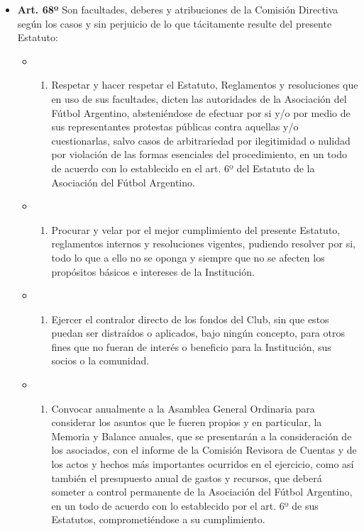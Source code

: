 \documentclass[openany]{book}
\providecommand{\tightlist}{%
  \setlength{\itemsep}{0pt}\setlength{\parskip}{0pt}}
\begin{document}
\begin{itemize}
\tightlist
\item
  \textbf{Art. 68º}
  Son facultades, deberes y atribuciones de la Comisión Directiva según los casos y sin perjuicio de lo que tácitamente resulte del presente Estatuto:

  \begin{itemize}
  \item
    \begin{enumerate}
    \def\labelenumi{\alph{enumi})}
    \tightlist
    \item
      Respetar y hacer respetar el Estatuto, Reglamentos y resoluciones que en uso de sus facultades, dicten las autoridades de la Asociación del Fútbol Argentino, absteniéndose de efectuar por si y/o por medio de sus representantes protestas públicas contra aquellas y/o cuestionarlas, salvo casos de arbitrariedad por ilegitimidad o nulidad por violación de las formas esenciales del procedimiento, en un todo de acuerdo con lo establecido en el art. 6º del Estatuto de la Asociación del Fútbol Argentino.
    \end{enumerate}
  \item
    \begin{enumerate}
    \def\labelenumi{\alph{enumi})}
    \setcounter{enumi}{1}
    \tightlist
    \item
      Procurar y velar por el mejor cumplimiento del presente Estatuto, reglamentos internos y resoluciones vigentes, pudiendo resolver por si, todo lo que a ello no se oponga y siempre que no se afecten los propósitos básicos e intereses de la Institución.
    \end{enumerate}
  \item
    \begin{enumerate}
    \def\labelenumi{\alph{enumi})}
    \setcounter{enumi}{2}
    \tightlist
    \item
      Ejercer el contralor directo de los fondos del Club, sin que estos puedan ser distraídos o aplicados, bajo ningún concepto, para otros fines que no fueran de interés o beneficio para la Institución, sus socios o la comunidad.
    \end{enumerate}
  \item
    \begin{enumerate}
    \def\labelenumi{\alph{enumi})}
    \setcounter{enumi}{3}
    \tightlist
    \item
      Convocar anualmente a la Asamblea General Ordinaria para considerar los asuntos que le fueren propios y en particular, la Memoria y Balance anuales, que se presentarán a la consideración de los asociados, con el informe de la Comisión Revisora de Cuentas y de los actos y hechos más importantes ocurridos en el ejercicio, como así también el presupuesto anual de gastos y recursos, que deberá someter a control permanente de la Asociación del Fútbol Argentino, en un todo de acuerdo con lo establecido por el art. 6º de sus Estatutos, comprometiéndose a su cumplimiento.

\end{enumerate}
\end{itemize}
\end{itemize}
\end{document}
